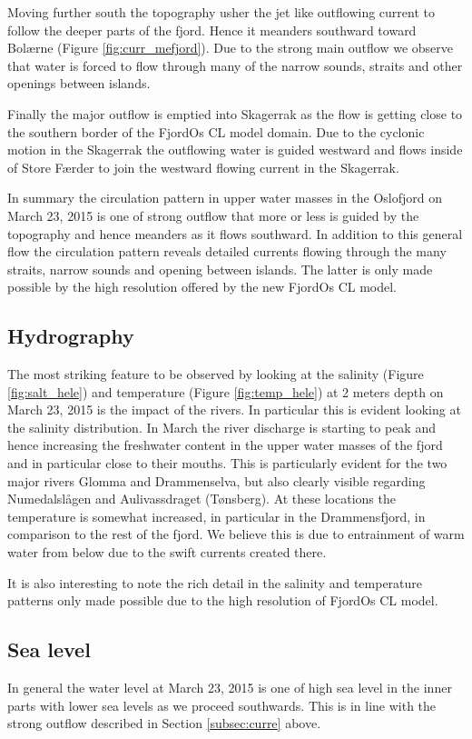 Moving further south the topography usher the jet like outflowing current to follow the deeper parts of the fjord. Hence it meanders southward toward Bol{\ae}rne (Figure \ref{fig:curr_mefjord}). Due to the strong main outflow we observe that water is forced to flow through many of the narrow sounds, straits and other openings between islands.    
 

Finally the major outflow is emptied into Skagerrak as the flow is getting close to the southern border of the FjordOs CL model domain. Due to the cyclonic motion in the Skagerrak the outflowing water is guided westward and flows inside of Store F{\ae}rder to join the westward flowing current in the Skagerrak.    
  

In summary the circulation pattern in upper water masses in the Oslofjord on March 23, 2015 is one of strong outflow that more or less is guided by the topography and hence meanders as it flows southward. In addition to this general flow the circulation pattern reveals detailed currents flowing through the many straits, narrow sounds and opening between islands. The latter is only made possible by the high resolution offered by the new FjordOs CL model.

\clearpage
\subsection{Hydrography}
\label{subsec:hydro}
The most striking feature to be observed by looking at the salinity (Figure \ref{fig:salt_hele}) and temperature (Figure \ref{fig:temp_hele}) at 2 meters depth on March 23, 2015 is the impact of the rivers. In particular this is evident looking at the salinity distribution. In March the river discharge is starting to peak and hence increasing the freshwater content in the upper water masses of the fjord and in particular close to their mouths. This is particularly evident for the two major rivers Glomma and Drammenselva, but also clearly visible regarding Numedalsl{\aa}gen and Aulivassdraget (T{\o}nsberg). At these locations the temperature is somewhat increased, in particular in the Drammensfjord, in comparison to the rest of the fjord. We believe this is due to entrainment of warm water from below due to the swift currents created there.    
   
  

It is also interesting to note the rich detail in the salinity and temperature patterns only made possible due to the high resolution of FjordOs CL model. 

\clearpage
\subsection{Sea level}
\label{subsec:seale}
In general the water level at March 23, 2015 is one of high sea level in the inner parts with lower sea levels as we proceed southwards. This is in line with the strong outflow described in Section \ref{subsec:curre} above.
   
\clearpage

